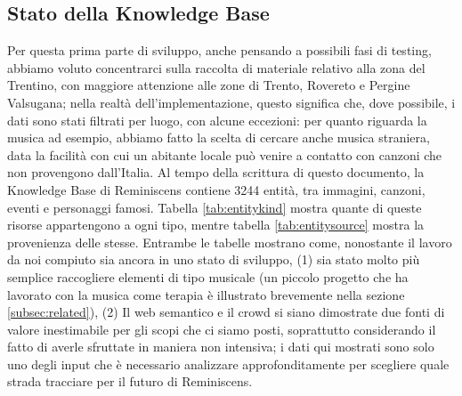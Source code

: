 \documentclass[sigproc-sp.tex]{subfiles}
\begin{document}
\subsection{Stato della Knowledge Base}
Per questa prima parte di sviluppo, anche pensando a possibili fasi di testing, abbiamo voluto concentrarci sulla raccolta di materiale relativo alla zona del Trentino, con maggiore attenzione alle zone di Trento, Rovereto e Pergine Valsugana; nella realtà dell’implementazione, questo significa che, dove possibile, i dati sono stati filtrati per luogo, con alcune eccezioni: per quanto riguarda la musica ad esempio, abbiamo fatto la scelta di cercare anche musica straniera, data la facilità con cui un abitante locale può venire a contatto con canzoni che non provengono dall’Italia. Al tempo della scrittura di questo documento, la Knowledge Base di Reminiscens contiene 3244 entità, tra immagini, canzoni, eventi e personaggi famosi. Tabella \ref{tab:entitykind} mostra quante di queste risorse appartengono a ogni tipo, mentre tabella \ref{tab:entitysource} mostra la provenienza delle stesse. Entrambe le tabelle mostrano come, nonostante il lavoro da noi compiuto sia ancora in uno stato di sviluppo, (1) sia stato molto più semplice raccogliere elementi di tipo musicale (un piccolo progetto che ha lavorato con la musica come terapia è illustrato brevemente nella sezione \ref{subsec:related}), (2) Il web semantico e il crowd si siano dimostrate due fonti di valore inestimabile per gli scopi che ci siamo posti, soprattutto considerando il fatto di averle sfruttate in maniera non intensiva; i dati qui mostrati sono solo uno degli input che è necessario analizzare approfonditamente per scegliere quale strada tracciare per il futuro di Reminiscens.
\end{document}
